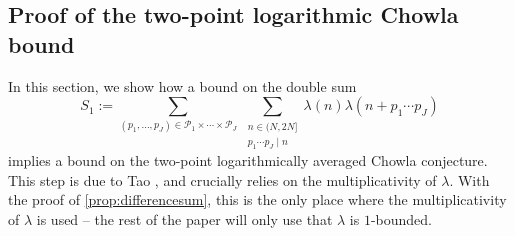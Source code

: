 \documentclass[11pt]{amsart}
\theoremstyle{definition}
\newcommand{\primes}{\mathcal{P}}
\newcommand{\repR}{J}
\begin{document}
\subsection{Proof of the two-point logarithmic Chowla bound}

In this section, we show how a bound on the double sum
\begin{equation}
\label{eq:summainthmBIS}
	S_1 := \sum_{(p_1, \ldots, p_{\repR})\in \primes_1\times \cdots \times \primes_{\repR}} \, \sum_{\substack{n\in (N, 2N] \\ p_1\cdots p_{\repR} \mid n}}\lambda(n) \lambda(n+p_1\cdots p_{\repR})
\end{equation}
implies a bound on the two-point logarithmically averaged Chowla conjecture. This step is due to Tao \cite{T}, and crucially relies on the multiplicativity of $\lambda$. With the proof of \cref{prop:differencesum}, this is the only place where the multiplicativity of $\lambda$ is used -- the rest of the paper will only use that $\lambda$ is $1$-bounded.
\end{document}
